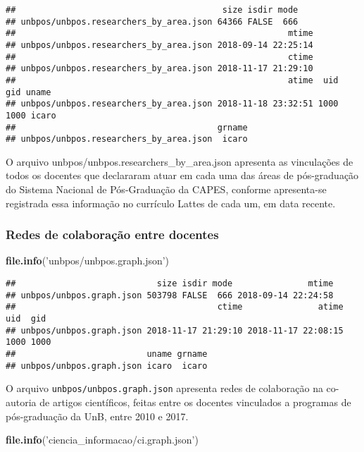 \documentclass[]{article}
\newenvironment{Shaded}{\begin{snugshade}}{\end{snugshade}}
\newcommand{\KeywordTok}[1]{\textcolor[rgb]{0.13,0.29,0.53}{\textbf{#1}}}
\newcommand{\StringTok}[1]{\textcolor[rgb]{0.31,0.60,0.02}{#1}}
\newcommand{\NormalTok}[1]{#1}
\begin{document}
\begin{verbatim}
##                                         size isdir mode
## unbpos/unbpos.researchers_by_area.json 64366 FALSE  666
##                                                      mtime
## unbpos/unbpos.researchers_by_area.json 2018-09-14 22:25:14
##                                                      ctime
## unbpos/unbpos.researchers_by_area.json 2018-11-17 21:29:10
##                                                      atime  uid  gid uname
## unbpos/unbpos.researchers_by_area.json 2018-11-18 23:32:51 1000 1000 icaro
##                                        grname
## unbpos/unbpos.researchers_by_area.json  icaro
\end{verbatim}

O arquivo unbpos/unbpos.researchers\_by\_area.json apresenta as
vinculações de todos os docentes que declararam atuar em cada uma das
áreas de pós-graduação do Sistema Nacional de Pós-Graduação da CAPES,
conforme apresenta-se registrada essa informação no currículo Lattes de
cada um, em data recente.

\subsubsection{Redes de colaboração entre
docentes}\label{redes-de-colaboracao-entre-docentes}

\begin{Shaded}
\begin{Highlighting}[]
\KeywordTok{file.info}\NormalTok{(}\StringTok{'unbpos/unbpos.graph.json'}\NormalTok{)}
\end{Highlighting}
\end{Shaded}

\begin{verbatim}
##                            size isdir mode               mtime
## unbpos/unbpos.graph.json 503798 FALSE  666 2018-09-14 22:24:58
##                                        ctime               atime  uid  gid
## unbpos/unbpos.graph.json 2018-11-17 21:29:10 2018-11-17 22:08:15 1000 1000
##                          uname grname
## unbpos/unbpos.graph.json icaro  icaro
\end{verbatim}

O arquivo \texttt{unbpos/unbpos.graph.json} apresenta redes de
colaboração na co-autoria de artigos científicos, feitas entre os
docentes vinculados a programas de pós-graduação da UnB, entre 2010 e
2017.

\begin{Shaded}
\begin{Highlighting}[]
\KeywordTok{file.info}\NormalTok{(}\StringTok{'ciencia_informacao/ci.graph.json'}\NormalTok{)}
\end{Highlighting}
\end{Shaded}
\end{document}
